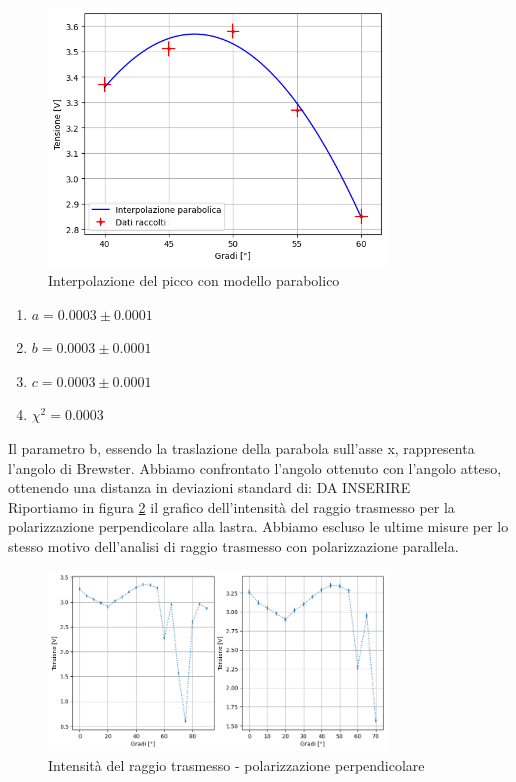\documentclass[letterpaper,12pt]{article}
\begin{document}
\begin{figure}[h!]
	\centering
	\includegraphics[width = 0.8\textwidth]{brew_angle.png}
	\caption{Interpolazione del picco con modello parabolico}
	\label{fig:parabola}
\end{figure}

\begin{enumerate}
	\item $a = 0.0003 \pm 0.0001$
	\item $b = 0.0003 \pm 0.0001$
	\item $c = 0.0003 \pm 0.0001$
	\item $\chi^2 = 0.0003$
\end{enumerate}

Il parametro b, essendo la traslazione della parabola sull'asse x, rappresenta l'angolo di Brewster. Abbiamo
confrontato l'angolo ottenuto con l'angolo atteso, ottenendo una distanza in deviazioni standard di: DA INSERIRE\\

Riportiamo in figura \ref{fig:wrong_pol} il grafico dell'intensità del raggio trasmesso per la polarizzazione
perpendicolare alla lastra. Abbiamo escluso le ultime misure per lo stesso motivo dell'analisi di raggio trasmesso
con polarizzazione parallela.\\

\begin{figure}[h!]
	\centering
	\includegraphics[width = 0.8\textwidth]{wrong_pol.png}
	\caption{Intensità del raggio trasmesso - polarizzazione perpendicolare}
	\label{fig:wrong_pol}
\end{figure}
\end{document}
